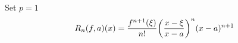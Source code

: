 \begin{theorem}
    Set $p=1$
    \begin{equation}
        R_n (f,a)(x) = \frac{f^{n+1}(\xi)}{n!}\mleft( \frac{x-\xi}{x-a} \mright)^n (x-a)^{n+1}
    \end{equation}
\end{theorem}










































































































